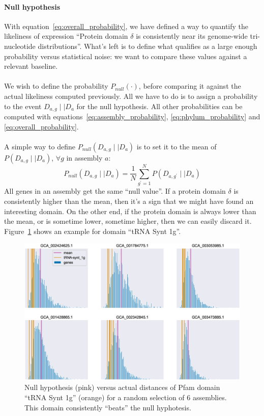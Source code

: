 \documentclass[12pt]{article}
\begin{document}
\paragraph{Null hypothesis}
With equation~\ref{eq:overall_probability}, we have defined a way to quantify the likeliness of expression ``Protein domain $\delta$ is consistently near its genome-wide tri-nucleotide distributions''. What's left is to define what qualifies as a large enough probability versus statistical noise: we want to compare these values against a relevant baseline.\\
\\
We wish to define the probability $P_{null}(\cdot)$, before comparing it against the actual likeliness computed previously. All we have to do is to assign a probability to the event $D_{a,g} \mid\mid D_a$ for the null hypothesis. All other probabilities can be computed with equations~\ref{eq:assembly_probability}, \ref{eq:phylum_probability} and \ref{eq:overall_probability}.\\
\\
A simple way to define $P_{null}(D_{a,g} \mid\mid D_a)$ is to set it to the mean of $P(D_{a,g} \mid\mid D_a)$, $\forall g$ in assembly $a$:
%
\begin{equation}
P_{null}(D_{a,g} \mid\mid D_a) = \frac{1}{N}\sum\limits_{g^{\prime}=1}^{N} P(D_{a,g^{\prime}} \mid\mid D_a)
\end{equation}
%
All genes in an assembly get the same ``null value''. If a protein domain $\delta$ is consistently higher than the mean, then it's a sign that we might have found an interesting domain. On the other end, if the protein domain is always lower than the mean, or is sometime lower, sometime higher, then we can easily discard it. Figure~\ref{fig:trna_synt_1g_dist} shows an example for domain ``tRNA Synt 1g''.

\pagebreak

\begin{figure}[!htb]
\hspace*{-1.2cm}
\includegraphics[scale = .5]{trna_synt_1g_dist.eps}
\caption{Null hypothesis (pink) versus actual distances of Pfam domain ``tRNA Synt 1g'' (orange) for a random selection of 6 assemblies. This domain consistently ``beats'' the null hyphotesis.}
\label{fig:trna_synt_1g_dist}
\end{figure}
\end{document}
